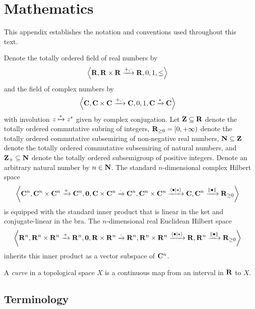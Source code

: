 

\chapter*{Mathematics}\label{app:math}

This appendix establishes the notation and conventions used throughout this text.

Denote the totally ordered field of real numbers by
\begin{align*}
	\left\langle \mathbf{R}, \mathbf{R} \times \mathbf{R} \xrightarrow{+, \cdot} \mathbf{R}, 0, 1, \leq \right\rangle
\end{align*}
and the field of complex numbers by
\begin{align*}
	\left\langle \mathbf{C}, \mathbf{C} \times \mathbf{C} \xrightarrow{+, \cdot} \mathbf{C}, 0, 1, \mathbf{C} \xrightarrow{*} \mathbf{C} \right\rangle
\end{align*}
with involution $z \xmapsto{*} z^*$ given by complex conjugation.
Let $\mathbf{Z} \subseteq \mathbf{R}$ denote the totally ordered commutative subring of integers, $\mathbf{R}_{\geq 0} = [0, +\infty)$ denote the totally ordered commutative subsemiring of non-negative real numbers, $\mathbf{N} \subseteq \mathbf{Z}$ denote the totally ordered commutative subsemiring of natural numbers, and $\mathbf{Z}_+ \subseteq \mathbf{N}$ denote the totally ordered subsemigroup of positive integers.
Denote an arbitrary natural number by $n \in \mathbf{N}$.
The standard $n$-dimensional complex Hilbert space
\begin{align*}
	\left\langle \mathbf{C}^n, \mathbf{C}^n \times \mathbf{C}^n \xrightarrow{+} \mathbf{C}^n, \mathbf{0}, \mathbf{C} \times \mathbf{C}^n \xrightarrow{\cdot} \mathbf{C}^n, \mathbf{C}^n \times \mathbf{C}^n \xrightarrow{\braket{\bullet \mid \star}} \mathbf{C}, \mathbf{C}^n \xrightarrow{\|\bullet\|} \mathbf{R}_{\geq 0} \right\rangle
\end{align*}
is equipped with the standard inner product that is linear in the ket and conjugate-linear in the bra.
The $n$-dimensional real Euclidean Hilbert space
\begin{align*}
	\left\langle \mathbf{R}^n, \mathbf{R}^n \times \mathbf{R}^n \xrightarrow{+} \mathbf{R}^n, \mathbf{0}, \mathbf{R} \times \mathbf{R}^n \xrightarrow{\cdot} \mathbf{R}^n, \mathbf{R}^n \times \mathbf{R}^n \xrightarrow{\braket{\bullet \mid \star}} \mathbf{R}, \mathbf{R}^n \xrightarrow{\|\bullet\|} \mathbf{R}_{\geq 0} \right\rangle
\end{align*}
inherits this inner product as a vector subspace of $\mathbf{C}^n$.

A \emph{curve} in a topological space $X$ is a continuous map from an interval in $\mathbf{R}$ to $X$.

\section*{Terminology}\label{sec:terminology}

